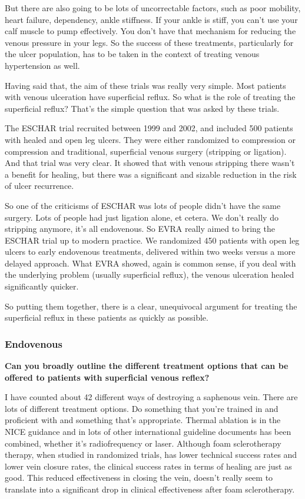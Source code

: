\documentclass[
]{book}
\begin{document}
But there are also going to be lots of uncorrectable factors, such as
poor mobility, heart failure, dependency, ankle stiffness. If your ankle
is stiff, you can't use your calf muscle to pump effectively. You don't
have that mechanism for reducing the venous pressure in your legs. So
the success of these treatments, particularly for the ulcer population,
has to be taken in the context of treating venous hypertension as well.

Having said that, the aim of these trials was really very simple. Most
patients with venous ulceration have superficial reflux. So what is the
role of treating the superficial reflux? That's the simple question that
was asked by these trials.

The ESCHAR trial recruited between 1999 and 2002, and included 500
patients with healed and open leg ulcers. They were either randomized to
compression or compression and traditional, superficial venous surgery
(stripping or ligation). And that trial was very clear. It showed that
with venous stripping there wasn't a benefit for healing, but there was
a significant and sizable reduction in the risk of ulcer
recurrence.\citep{gohel2007}

So one of the criticisms of ESCHAR was lots of people didn't have the
same surgery. Lots of people had just ligation alone, et cetera. We
don't really do stripping anymore, it's all endovenous. So EVRA really
aimed to bring the ESCHAR trial up to modern practice. We randomized 450
patients with open leg ulcers to early endovenous treatments, delivered
within two weeks versus a more delayed approach. What EVRA showed, again
is common sense, if you deal with the underlying problem (usually
superficial reflux), the venous ulceration healed significantly
quicker.\citep{gohel2018}

So putting them together, there is a clear, unequivocal argument for
treating the superficial reflux in these patients as quickly as
possible.

\hypertarget{endovenous}{%
\subsubsection{Endovenous}\label{endovenous}}

\textbf{Can you broadly outline the different treatment options that can be
offered to patients with superficial venous reflex?}

I have counted about 42 different ways of destroying a saphenous vein.
There are lots of different treatment options. Do something that you're
trained in and proficient with and something that's appropriate. Thermal
ablation is in the NICE guidance and in lots of other international
guideline documents has been combined, whether it's radiofrequency or
laser. Although foam sclerotherapy therapy, when studied in randomized
trials, has lower technical success rates and lower vein closure rates,
the clinical success rates in terms of healing are just as good. This
reduced effectiveness in closing the vein, doesn't really seem to
translate into a significant drop in clinical effectiveness after foam
sclerotherapy.
\end{document}
